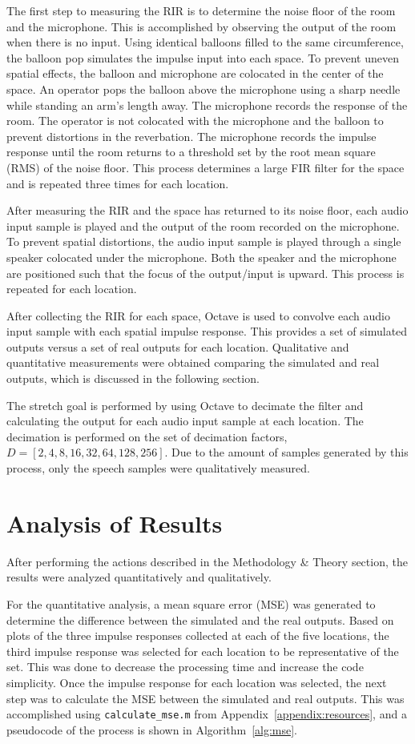 \documentclass[letterpaper, 11pt, onecolumn, oneside]{article}
\begin{document}
The first step to measuring the RIR is to determine the noise floor of the room and the microphone.
This is accomplished by observing the output of the room when there is no input.
Using identical balloons filled to the same circumference, the balloon pop simulates the impulse input into each space.
To prevent uneven spatial effects, the balloon and microphone are colocated in the center of the space.
An operator pops the balloon above the microphone using a sharp needle while standing an arm's length away.
The microphone records the response of the room.
The operator is not colocated with the microphone and the balloon to prevent distortions in the reverbation.
The microphone records the impulse response until the room returns to a threshold set by the root mean square (RMS) of the noise floor.
This process determines a large FIR filter for the space and is repeated three times for each location.

After measuring the RIR and the space has returned to its noise floor, each audio input sample is played and the output of the room recorded on the microphone.
To prevent spatial distortions, the audio input sample is played through a single speaker colocated under the microphone.
Both the speaker and the microphone are positioned such that the focus of the output/input is upward.
This process is repeated for each location.

After collecting the RIR for each space, Octave is used to convolve each audio input sample with each spatial impulse response.
This provides a set of simulated outputs versus a set of real outputs for each location.
Qualitative and quantitative measurements were obtained comparing the simulated and real outputs, which is discussed in the following section.

The stretch goal is performed by using Octave to decimate the filter and calculating the output for each audio input sample at each location.
The decimation is performed on the set of decimation factors, $D = [2, 4, 8, 16, 32, 64, 128, 256]$.
Due to the amount of samples generated by this process, only the speech samples were qualitatively measured.

\clearpage
\section{Analysis of Results}
After performing the actions described in the Methodology \& Theory section, the results were analyzed quantitatively and qualitatively.

For the quantitative analysis, a mean square error (MSE) was generated to determine the difference between the simulated and the real outputs.
Based on plots of the three impulse responses collected at each of the five locations, the third impulse response was selected for each location to be representative of the set.
This was done to decrease the processing time and increase the code simplicity.
Once the impulse response for each location was selected, the next step was to calculate the MSE between the simulated and real outputs.
This was accomplished using \texttt{calculate\_mse.m} from Appendix~\ref{appendix:resources}, and a pseudocode of the process is shown in Algorithm~\ref{alg:mse}.
\end{document}
